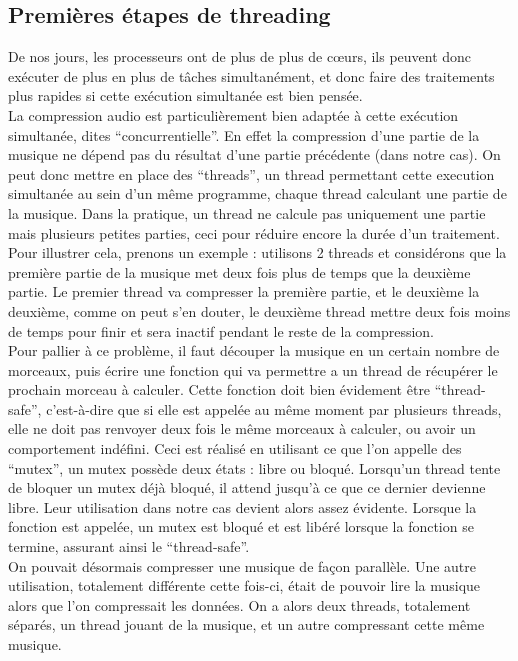 \documentclass[a4paper,12pt]{article}
\begin{document}
	\subsection{Premières étapes de threading}
De nos jours,  les processeurs ont de plus de plus de cœurs, ils peuvent
donc exécuter de plus en plus de tâches simultanément, et donc faire des
traitements  plus  rapides  si   cette  exécution  simultanée  est  bien
pensée.\\
La compression audio est particulièrement bien adaptée à cette exécution
simultanée,  dites ``concurrentielle''.  En  effet la  compression d'une
partie de la  musique ne dépend pas du  résultat d'une partie précédente
(dans notre  cas).  On peut  donc mettre  en place  des ``threads'',  un
thread  permettant   cette  execution  simultanée  au   sein  d'un  même
programme,  chaque thread  calculant une partie de  la musique.  Dans la
pratique,  un thread ne calcule pas uniquement une partie mais plusieurs
petites  parties,  ceci pour  réduire encore  la durée  d'un traitement.
Pour  illustrer  cela,  prenons un  exemple  :  utilisons  2  threads et
considérons que la  première partie de la musique met  deux fois plus de
temps  que  la deuxième  partie.  Le  premier  thread  va  compresser la
première partie,  et le deuxième la deuxième, comme on peut s'en douter,
le deuxième  thread mettre deux fois  moins de temps pour  finir et sera
inactif pendant le reste de la compression.\\
Pour pallier à  ce problème,  il faut découper la  musique en un certain
nombre  de morceaux,  puis  écrire une  fonction qui  va permettre  a un
thread de récupérer le prochain morceau à calculer.  Cette fonction doit
bien  évidement  être  ``thread-safe'',  c'est-à-dire  que  si  elle est
appelée au même moment par plusieurs threads,  elle ne doit pas renvoyer
deux  fois  le  même  morceaux  à  calculer,  ou  avoir  un comportement
indéfini.  Ceci  est  réalisé  en  utilisant  ce  que  l'on  appelle des
``mutex'',  un mutex  possède deux états  : libre  ou bloqué.  Lorsqu'un
thread tente de bloquer un mutex  déjà bloqué,  il attend jusqu'à ce que
ce dernier  devienne  libre.  Leur  utilisation  dans  notre cas devient
alors assez  évidente.  Lorsque la fonction  est appelée,  un  mutex est
bloqué et est libéré lorsque  la fonction se termine,  assurant ainsi le
``thread-safe''.\\
On  pouvait désormais  compresser une  musique de  façon parallèle.  Une
autre utilisation, totalement différente cette fois-ci, était de pouvoir
lire la musique alors que l'on compressait les données.  On a alors deux
threads, totalement séparés, un thread jouant de la musique, et un autre
compressant cette même musique.\\
\end{document}
